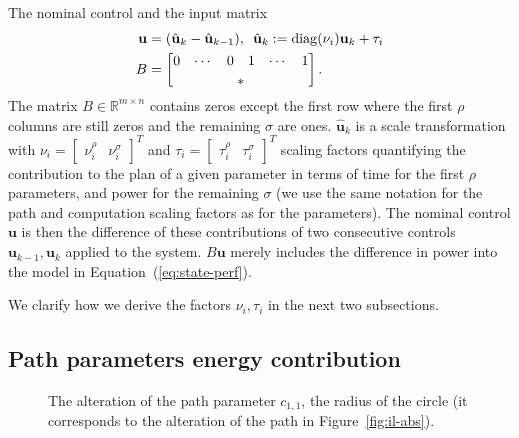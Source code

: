 \documentclass[letterpaper,10pt,conference]{ieeeconf}
\newcommand{\figpath}{./figures}
\theoremstyle{definition}
\begin{document}
The nominal control and the input matrix
\begin{equation}\label{eq:state-control}\begin{split}
  \mathbf{u}&=(\hat{\mathbf{u}}_k-\hat{\mathbf{u}}_{k-1}),\,\,\,\hat{\mathbf{u}}_k:=\mathrm{diag}(\nu_i)\mathbf{u}_k+\tau_i\\
  B&=\begin{bmatrix} 0 & \cdots & 0 & 1 & \cdots & 1 \\ 
    & & & \makebox(-15,-3){*} & &\end{bmatrix}.
\end{split}\end{equation}
The matrix $B\in\mathbb{R}^{m\times n}$ contains zeros except the first row where the first $\rho$ columns are still zeros and the remaining $\sigma$ are ones. $\hat{\mathbf{u}}_k$ is a scale transformation with $\nu_i=\begin{bmatrix}\nu_i^\rho & \nu_i^\sigma\end{bmatrix}^T$ and $\tau_i=\begin{bmatrix}\tau_i^\rho & \tau_i^\sigma\end{bmatrix}^T$ scaling factors quantifying the contribution to the plan of a given parameter in terms of time for the first $\rho$ parameters, and power for the remaining $\sigma$ (we use the same notation for the path and computation scaling factors as for the parameters). The nominal control $\mathbf{u}$ is then the difference of these contributions of two consecutive controls $\mathbf{u}_{k-1},\mathbf{u}_k$ applied to the system. $B\mathbf{u}$ merely includes the difference in power into the model in Equation~(\ref{eq:state-perf}).
 

We clarify how we derive the factors $\nu_i,\tau_i$ in the next two subsections.

\subsection{Path parameters energy contribution}
\label{sec:model}

\begin{figure}[h]
  \centering
  \footnotesize
  
  \caption{The alteration of the path parameter $c_{1,1}$, the radius of the circle (it corresponds to the alteration of the path in Figure~\ref{fig:il-abs}).}
  \label{fig:tee1}
\end{figure}
\end{document}
